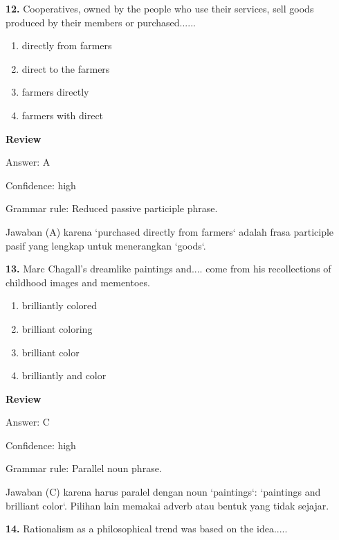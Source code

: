 \documentclass[12pt]{article}
\begin{document}
\vspace{0.25\baselineskip}
\noindent\textbf{12.} Cooperatives, owned by the people who use their services, sell goods produced by their members or purchased......
\begin{enumerate}[label=(\Alph*),leftmargin=*,itemsep=0.2em]
\item directly from farmers
\item direct to the farmers
\item farmers directly
\item farmers with direct
\end{enumerate}
\par
\begingroup
\setlength{\parskip}{0pt}
\setlength{\parindent}{0pt}
\textbf{Review}\par
Answer: A\par
Confidence: high\par
Grammar rule: Reduced passive participle phrase.\par
Jawaban (A) karena `purchased directly from farmers` adalah frasa participle pasif yang lengkap untuk menerangkan `goods`.\par
\endgroup
\par
\vspace{0.25\baselineskip}
\noindent\textbf{13.} Marc Chagall's dreamlike paintings and.... come from his recollections of childhood images and mementoes.
\begin{enumerate}[label=(\Alph*),leftmargin=*,itemsep=0.2em]
\item brilliantly colored
\item brilliant coloring
\item brilliant color
\item brilliantly and color
\end{enumerate}
\par
\begingroup
\setlength{\parskip}{0pt}
\setlength{\parindent}{0pt}
\textbf{Review}\par
Answer: C\par
Confidence: high\par
Grammar rule: Parallel noun phrase.\par
Jawaban (C) karena harus paralel dengan noun `paintings`: `paintings and brilliant color`. Pilihan lain memakai adverb atau bentuk yang tidak sejajar.\par
\endgroup
\par
\vspace{0.25\baselineskip}
\noindent\textbf{14.} Rationalism as a philosophical trend was based on the idea.....
\end{document}
